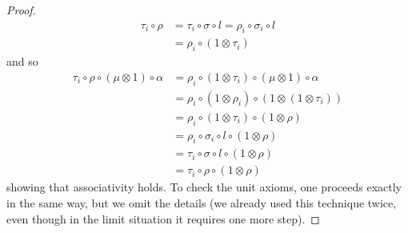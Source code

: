 \begin{refsection}
\begin{proof}
\begin{align*}
\tau_i \circ \rho & = \tau_i \circ \sigma \circ l = \rho_i \circ \sigma_i \circ l \\
& = \rho_i \circ (1 \otimes \tau_i)
\end{align*}
and so
\begin{align*}
\tau_i \circ \rho \circ(\mu \otimes 1) \circ \alpha & = \rho_i \circ (1 \otimes \tau_i) \circ (\mu \otimes 1) \circ \alpha \\
& = \rho_i \circ (1 \otimes \rho_i) \circ (1 \otimes (1 \otimes \tau_i)) \\
& = \rho_i \circ (1 \otimes \tau_i) \circ (1 \otimes \rho) \\
& = \rho_i \circ \sigma_i \circ l \circ (1 \otimes \rho) \\
& = \tau_i \circ \sigma \circ l \circ (1 \otimes \rho) \\
& = \tau_i \circ \rho \circ (1 \otimes \rho)
\end{align*}
showing that associativity holds. To check the unit axioms, one proceeds exactly in the same way, but we omit the details (we already used this technique twice, even though in the limit situation it requires one more step).


\end{proof}
\end{refsection}
